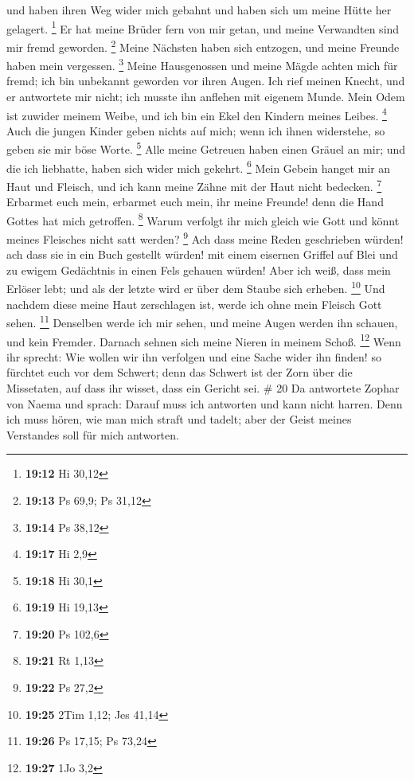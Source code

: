und haben ihren Weg wider mich gebahnt und haben sich um meine Hütte her
gelagert. \footnote{\textbf{19:12} Hi 30,12}  Er hat meine
Brüder fern von mir getan, und meine Verwandten sind mir fremd geworden.
\footnote{\textbf{19:13} Ps 69,9; Ps 31,12}  Meine Nächsten
haben sich entzogen, und meine Freunde haben mein vergessen. \footnote{\textbf{19:14}
  Ps 38,12}  Meine Hausgenossen und meine Mägde achten mich
für fremd; ich bin unbekannt geworden vor ihren Augen.  Ich
rief meinen Knecht, und er antwortete mir nicht; ich musste ihn anflehen
mit eigenem Munde.  Mein Odem ist zuwider meinem Weibe, und
ich bin ein Ekel den Kindern meines Leibes. \footnote{\textbf{19:17} Hi
  2,9}  Auch die jungen Kinder geben nichts auf mich; wenn
ich ihnen widerstehe, so geben sie mir böse Worte. \footnote{\textbf{19:18}
  Hi 30,1}  Alle meine Getreuen haben einen Gräuel an mir;
und die ich liebhatte, haben sich wider mich gekehrt. \footnote{\textbf{19:19}
  Hi 19,13}  Mein Gebein hanget mir an Haut und Fleisch,
und ich kann meine Zähne mit der Haut nicht bedecken. \footnote{\textbf{19:20}
  Ps 102,6}  Erbarmet euch mein, erbarmet euch mein, ihr
meine Freunde! denn die Hand Gottes hat mich getroffen. \footnote{\textbf{19:21}
  Rt 1,13}  Warum verfolgt ihr mich gleich wie Gott und
könnt meines Fleisches nicht satt werden? \footnote{\textbf{19:22} Ps
  27,2}  Ach dass meine Reden geschrieben würden! ach dass
sie in ein Buch gestellt würden!  mit einem eisernen
Griffel auf Blei und zu ewigem Gedächtnis in einen Fels gehauen würden!
 Aber ich weiß, dass mein Erlöser lebt; und als der letzte
wird er über dem Staube sich erheben. \footnote{\textbf{19:25} 2Tim
  1,12; Jes 41,14}  Und nachdem diese meine Haut
zerschlagen ist, werde ich ohne mein Fleisch Gott sehen. \footnote{\textbf{19:26}
  Ps 17,15; Ps 73,24}  Denselben werde ich mir sehen, und
meine Augen werden ihn schauen, und kein Fremder. Darnach sehnen sich
meine Nieren in meinem Schoß. \footnote{\textbf{19:27} 1Jo 3,2}
 Wenn ihr sprecht: Wie wollen wir ihn verfolgen und eine
Sache wider ihn finden!  so fürchtet euch vor dem Schwert;
denn das Schwert ist der Zorn über die Missetaten, auf dass ihr wisset,
dass ein Gericht sei. \# 20  Da antwortete Zophar von Naema
und sprach:  Darauf muss ich antworten und kann nicht
harren.  Denn ich muss hören, wie man mich straft und
tadelt; aber der Geist meines Verstandes soll für mich antworten.
